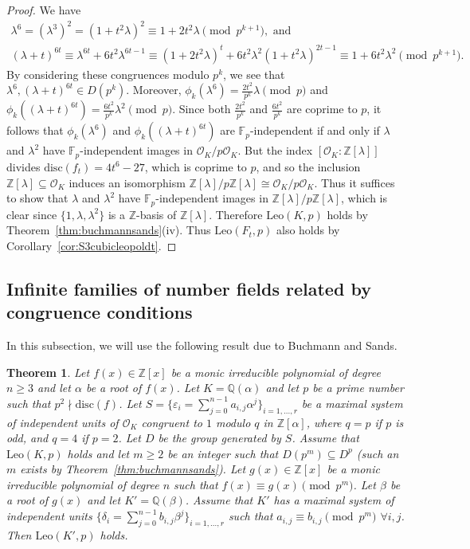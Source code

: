 \documentclass[12pt]{amsart}
\theoremstyle{plain}
\newtheorem{theorem}{Theorem}[section]
\theoremstyle{remark}
\theoremstyle{definition}
\newcommand{\Z}{\mathbb{Z}}
\newcommand{\Q}{\mathbb{Q}}
\newcommand{\F}{\mathbb{F}}
\newcommand{\Leo}{\mathrm{Leo}}
\numberwithin{equation}{section}
\begin{document}
\begin{proof}
We have
\begin{gather*}
\lambda^{6} = (\lambda^{3})^{2} = (1+t^{2}\lambda)^{2}  \equiv 1 + 2t^{2}\lambda \pmod{p^{k+1}},
\text{ and} \\
(\lambda+t)^{6t} 
\equiv \lambda^{6t} + 6t^{2}\lambda^{6t-1}
\equiv (1 + 2t^{2}\lambda)^{t} + 6t^{2}\lambda^{2}(1+t^{2}\lambda)^{2t-1}
\equiv 1 +  6t^{2}\lambda^{2} \pmod{p^{k+1}}. 
\end{gather*}
By considering these congruences modulo $p^{k}$, we see that
$\lambda^{6}, (\lambda+t)^{6t} \in D(p^{k})$. Moreover, 
$\phi_{k}(\lambda^{6}) = \frac{2t^{2}}{p^{k}} \lambda \pmod{p}$
and $\phi_{k}((\lambda+t)^{6t})=\frac{6t^{2}}{p^{k}} \lambda^{2} \pmod{p}$.
Since both $\frac{2t^2}{p^{k}}$ and $\frac{6t^2}{p^{k}}$ are coprime to $p$,
it follows that $\phi_{k}(\lambda^{6})$ and $\phi_{k}((\lambda+t)^{6t})$ are $\F_{p}$-independent
if and only if $\lambda$ and $\lambda^{2}$ have $\F_{p}$-independent images in 
$\mathcal{O}_{K}/p\mathcal{O}_{K}$.
But the index $[\mathcal{O}_{K} : \Z[\lambda]]$ divides 
$\mathrm{disc}(f_{t})=4t^{6}-27$, which is coprime to $p$, and
so the inclusion $\Z[\lambda] \subseteq \mathcal{O}_{K}$ induces 
an isomorphism $\Z[\lambda]/p\Z[\lambda] \cong \mathcal{O}_{K}/p\mathcal{O}_{K}$.
Thus it suffices to show that $\lambda$ and $\lambda^{2}$ have $\F_{p}$-independent images in 
$\Z[\lambda]/p\Z[\lambda]$, which is clear since 
$\{ 1,\lambda,\lambda^{2} \}$ is a $\Z$-basis of $\Z[\lambda]$. 
Therefore $\Leo(K,p)$ holds by Theorem~\ref{thm:buchmannsands}(iv). 
Thus $\Leo(F_{t},p)$ also holds by Corollary~\ref{cor:S3cubicleopoldt}.
\end{proof}

\subsection{Infinite families of number fields related by congruence conditions}\label{subsec:infinite-families}
In this subsection, we will use the following result due to Buchmann and Sands.

\begin{theorem}\cite[Theorem 4.1]{MR958040}\label{thm:BSapprox}
Let $f(x) \in \Z[x]$ be a monic irreducible polynomial of degree $n \geq 3$ and let $\alpha$ be a root of $f(x)$.
Let $K=\Q(\alpha)$ and let $p$ be a prime number such that $p^2 \nmid \mathrm{disc}(f)$.
Let $S=\{ \varepsilon_i=\sum_{j=0}^{n-1}a_{i,j}\alpha^{j} \}_{i=1,...,r}$ be a maximal system of independent units of $\mathcal{O}_{K}$ congruent to $1$ modulo $q$ in $\Z[\alpha]$, where $q=p$ if $p$ is odd, and $q=4$ if $p=2$. 
Let $D$ be the group generated by $S$.
Assume that $\Leo(K,p)$ holds and let $m\geq 2$ be an integer such that $D(p^{m})\subseteq D^{p}$
(such an $m$ exists by Theorem~\ref{thm:buchmannsands}). 
Let $g(x) \in \Z[x]$ be a monic irreducible polynomial of degree $n$ such that $f(x) \equiv g(x) \pmod{p^{m}}$. Let $\beta$ be a root of $g(x)$ and let $K'=\Q(\beta)$. 
Assume that $K'$ has a maximal system of independent units 
$\{\delta_{i} = \sum_{j=0}^{n-1}b_{i,j}\beta^{j} \}_{i=1,...,r}$ 
such that $a_{i,j}\equiv b_{i,j}\pmod {p^m}$ $\forall i,j$. Then $\Leo(K',p)$ holds.
\end{theorem}
\end{document}
